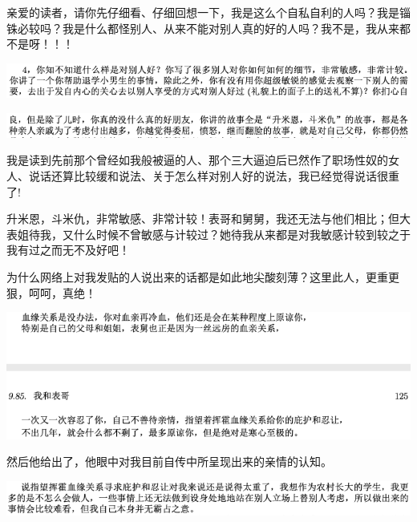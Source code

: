 \documentclass[9pt, b5paper]{article}
\begin{document}
亲爱的读者，请你先仔细看、仔细回想一下，我是这么个自私自利的人吗？我是锱铢必较吗？我是什么都怪别人、从来不能对别人真的好的人吗？我不是，我从来都不是呀！！！

\begin{center}
\includegraphics[width=.9\linewidth]{./pic/backups_plans_20210413_142517.png}
\end{center}

\begin{center}
\includegraphics[width=.9\linewidth]{./pic/backups_plans_20210413_143045.png}
\end{center}

我是读到先前那个曾经如我般被逼的人、那个三大逼迫后已然作了职场性奴的女人、说话还算比较缓和说法、关于怎么样对别人好的说法，我已经觉得说话很重了!

升米恩，斗米仇，非常敏感、非常计较！表哥和舅舅，我还无法与他们相比；但大表姐待我，又什么时候不曾敏感与计较过？她待我从来都是对我敏感计较到较之于我有过之而无不及好吧！

为什么网络上对我发贴的人说出来的话都是如此地尖酸刻薄？这里此人，更重更狠，呵呵，真绝！

\begin{center}
\includegraphics[width=.9\linewidth]{./pic/backups_plans_20210413_131357.png}
\end{center}

然后他给出了，他眼中对我目前自传中所呈现出来的亲情的认知。

\begin{center}
\includegraphics[width=.9\linewidth]{./pic/backups_plans_20210413_143417.png}
\end{center}
\end{document}
